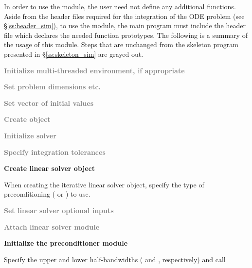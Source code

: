 In order to use the {\cvbandpre} module, the user need not define any
additional functions.
Aside from the header files required for the integration of the ODE problem
(see \S\ref{ss:header_sim}),  to use the {\cvbandpre} module, the main program
must include the header file  which declares the needed
function prototypes.
The following is a summary of the usage of this module. Steps that are
unchanged from the skeleton program presented in
\S\ref{ss:skeleton_sim} are grayed out.
\begin{Steps}

\item
  \textcolor{gray}{\bf Initialize multi-threaded environment, if appropriate}

\item
  \textcolor{gray}{\bf Set problem dimensions etc.}

\item
  \textcolor{gray}{\bf Set vector of initial values}

\item
  \textcolor{gray}{\bf Create {\cvode} object}

\item
  \textcolor{gray}{\bf Initialize {\cvode} solver}

\item
  \textcolor{gray}{\bf Specify integration tolerances}

\item
  {\bf Create linear solver object}

  When creating the iterative linear solver object, specify the type
  of preconditioning ( or ) to use.

\item
  \textcolor{gray}{\bf Set linear solver optional inputs}

\item \label{i:bandpre_attach}
  \textcolor{gray}{\bf Attach linear solver module}

\item \label{i:bandpre_init}
  {\bf Initialize the {\cvbandpre} preconditioner module}

  Specify the upper and lower half-bandwidths ( and , respectively) and call



\end{Steps}
